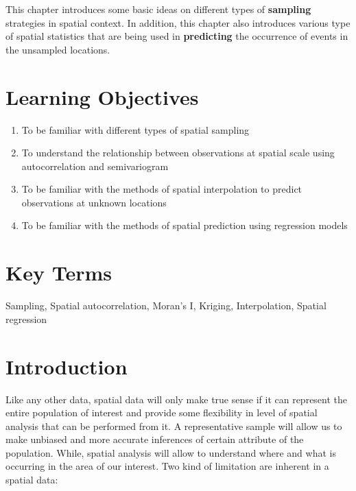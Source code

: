 \documentclass[
]{book}
\providecommand{\tightlist}{%
  \setlength{\itemsep}{0pt}\setlength{\parskip}{0pt}}
\begin{document}
This chapter introduces some basic ideas on different types of \textbf{sampling} strategies in spatial context. In addition, this chapter also introduces various type of spatial statistics that are being used in \textbf{predicting} the occurrence of events in the unsampled locations.

\hypertarget{learning-objectives-9}{%
\section*{Learning Objectives}\label{learning-objectives-9}}

\begin{enumerate}
\def\labelenumi{\arabic{enumi}.}
\tightlist
\item
  To be familiar with different types of spatial sampling
\item
  To understand the relationship between observations at spatial scale using autocorrelation and semivariogram
\item
  To be familiar with the methods of spatial interpolation to predict observations at unknown locations
\item
  To be familiar with the methods of spatial prediction using regression models
\end{enumerate}

\hypertarget{key-terms-9}{%
\section*{Key Terms}\label{key-terms-9}}

Sampling, Spatial autocorrelation, Moran's I, Kriging, Interpolation, Spatial regression

\hypertarget{introduction}{%
\section{Introduction}\label{introduction}}

Like any other data, spatial data will only make true sense if it can represent the entire population of interest and provide some flexibility in level of spatial analysis that can be performed from it. A representative sample will allow us to make unbiased and more accurate inferences of certain attribute of the population. While, spatial analysis will allow to understand where and what is occurring in the area of our interest. Two kind of limitation are inherent in a spatial data:
\end{document}
